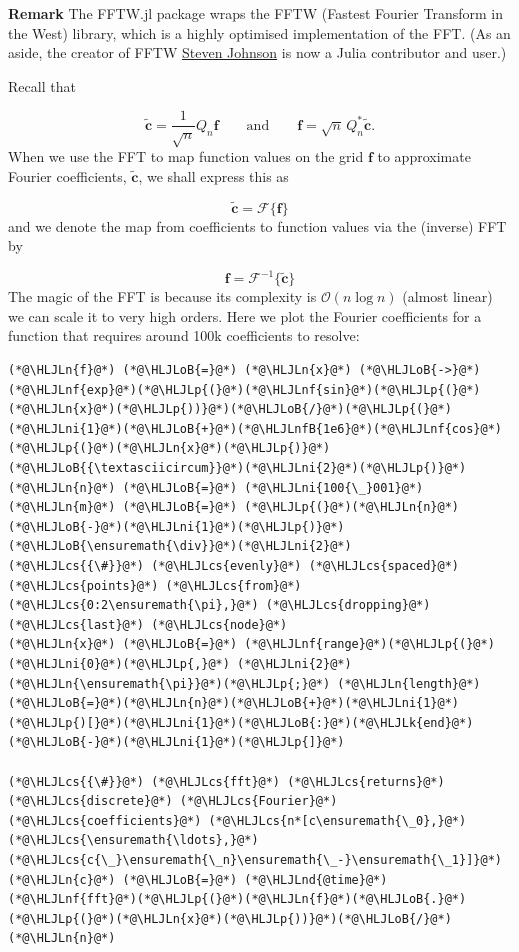 \documentclass[12pt,landscape]{article}
\newcommand{\HLJLk}[1]{\textcolor[RGB]{148,91,176}{\textbf{#1}}}
\newcommand{\HLJLn}[1]{#1}
\newcommand{\HLJLnd}[1]{\textcolor[RGB]{214,102,97}{#1}}
\newcommand{\HLJLnf}[1]{\textcolor[RGB]{66,102,213}{#1}}
\newcommand{\HLJLnfB}[1]{\textcolor[RGB]{59,151,46}{#1}}
\newcommand{\HLJLni}[1]{\textcolor[RGB]{59,151,46}{#1}}
\newcommand{\HLJLoB}[1]{\textcolor[RGB]{102,102,102}{\textbf{#1}}}
\newcommand{\HLJLp}[1]{#1}
\newcommand{\HLJLcs}[1]{\textcolor[RGB]{153,153,119}{\textit{#1}}}
\begin{document}
{\textbf{Remark} The FFTW.jl package wraps the FFTW (Fastest Fourier Transform in the West) library, which is a highly optimised implementation of the FFT. (As an aside, the creator of FFTW \href{https://math.mit.edu/~stevenj/}{Steven Johnson} is now a Julia contributor and user.)

Recall that 

\[
\widetilde{\mathbf{c}} =  \frac{1}{\sqrt{n}}Q_{n}\mathbf{f} \qquad \text{and} \qquad \mathbf{f} = \sqrt{n}\,Q_{n}^*\widetilde{\mathbf{c}}.
\]
When we use the FFT to map function values on the grid $\mathbf{f}$ to approximate Fourier coefficients, $\widetilde{\mathbf{c}}$, we shall express this as

\[
\widetilde{\mathbf{c}} = \mathcal{F}\lbrace \mathbf{f}  \rbrace
\]
and we denote the map from coefficients to function values via the (inverse) FFT by

\[
\mathbf{f}  = \mathcal{F}^{-1}\lbrace \widetilde{\mathbf{c}} \rbrace
\]
The magic of the FFT is because its complexity is $\mathcal{O}(n \log n)$ (almost linear) we can scale it to very high orders. Here we plot the Fourier coefficients for a function that requires around 100k coefficients to resolve:


\begin{lstlisting}
(*@\HLJLn{f}@*) (*@\HLJLoB{=}@*) (*@\HLJLn{x}@*) (*@\HLJLoB{->}@*) (*@\HLJLnf{exp}@*)(*@\HLJLp{(}@*)(*@\HLJLnf{sin}@*)(*@\HLJLp{(}@*)(*@\HLJLn{x}@*)(*@\HLJLp{))}@*)(*@\HLJLoB{/}@*)(*@\HLJLp{(}@*)(*@\HLJLni{1}@*)(*@\HLJLoB{+}@*)(*@\HLJLnfB{1e6}@*)(*@\HLJLnf{cos}@*)(*@\HLJLp{(}@*)(*@\HLJLn{x}@*)(*@\HLJLp{)}@*)(*@\HLJLoB{{\textasciicircum}}@*)(*@\HLJLni{2}@*)(*@\HLJLp{)}@*)
(*@\HLJLn{n}@*) (*@\HLJLoB{=}@*) (*@\HLJLni{100{\_}001}@*)
(*@\HLJLn{m}@*) (*@\HLJLoB{=}@*) (*@\HLJLp{(}@*)(*@\HLJLn{n}@*)(*@\HLJLoB{-}@*)(*@\HLJLni{1}@*)(*@\HLJLp{)}@*)(*@\HLJLoB{\ensuremath{\div}}@*)(*@\HLJLni{2}@*)
(*@\HLJLcs{{\#}}@*) (*@\HLJLcs{evenly}@*) (*@\HLJLcs{spaced}@*) (*@\HLJLcs{points}@*) (*@\HLJLcs{from}@*) (*@\HLJLcs{0:2\ensuremath{\pi},}@*) (*@\HLJLcs{dropping}@*) (*@\HLJLcs{last}@*) (*@\HLJLcs{node}@*)
(*@\HLJLn{x}@*) (*@\HLJLoB{=}@*) (*@\HLJLnf{range}@*)(*@\HLJLp{(}@*)(*@\HLJLni{0}@*)(*@\HLJLp{,}@*) (*@\HLJLni{2}@*)(*@\HLJLn{\ensuremath{\pi}}@*)(*@\HLJLp{;}@*) (*@\HLJLn{length}@*)(*@\HLJLoB{=}@*)(*@\HLJLn{n}@*)(*@\HLJLoB{+}@*)(*@\HLJLni{1}@*)(*@\HLJLp{)[}@*)(*@\HLJLni{1}@*)(*@\HLJLoB{:}@*)(*@\HLJLk{end}@*)(*@\HLJLoB{-}@*)(*@\HLJLni{1}@*)(*@\HLJLp{]}@*)

(*@\HLJLcs{{\#}}@*) (*@\HLJLcs{fft}@*) (*@\HLJLcs{returns}@*) (*@\HLJLcs{discrete}@*) (*@\HLJLcs{Fourier}@*) (*@\HLJLcs{coefficients}@*) (*@\HLJLcs{n*[c\ensuremath{\_0},}@*) (*@\HLJLcs{\ensuremath{\ldots},}@*) (*@\HLJLcs{c{\_}\ensuremath{\_n}\ensuremath{\_-}\ensuremath{\_1}]}@*)
(*@\HLJLn{c}@*) (*@\HLJLoB{=}@*) (*@\HLJLnd{@time}@*) (*@\HLJLnf{fft}@*)(*@\HLJLp{(}@*)(*@\HLJLn{f}@*)(*@\HLJLoB{.}@*)(*@\HLJLp{(}@*)(*@\HLJLn{x}@*)(*@\HLJLp{))}@*)(*@\HLJLoB{/}@*)(*@\HLJLn{n}@*)


\end{lstlisting}}
\end{document}
